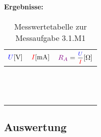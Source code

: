 \documentclass[11pt,a4paper,titlepage,parskip=half]{scrreprt}
\begin{document}
              \paragraph{Ergebnisse:}
                   \begin{center}
                        \begin{table}[H]
                            \caption{Messwertetabelle zur Messaufgabe 3.1.M1}
                            \label{tbl:messergebnisse3.1}
                            \renewcommand{\arraystretch}{1.5}
                            \begin{center}
                                \begin{tabular}{c|c|c}
                                    $\textcolor{blue}{U} [\si{\volt}]$  &
                                    $\textcolor{red}{I} [\si{\milli\ampere}]$ &
                                    $\widerstand{R_A} = \mfrac{\spannung{U}}{\strom{I}} [\si{\ohm}]$\\ \hline

                                    \quad\quad\quad & \quad\quad\quad & \quad\quad\quad\\\hline
                                     &  & \\\hline
                                     &  & \\\hline
                                     &  & \\\hline
                                     & & \\\hline
                                     &  & \\\hline
                                     &  & \\\hline
                                     & & \\\hline
                                     &  & \\\hline
                                     &  & \\\hline
                                     &  & \\\hline
                                     &  & \\\hline
                                     &  & \\
                                \end{tabular}
                            \end{center}
                        \end{table}
                    \end{center}
         \subsection{Auswertung}
\end{document}
